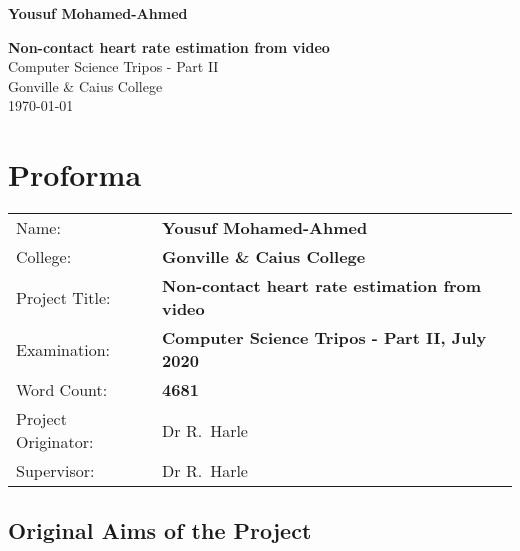 \documentclass[12pt,twoside,notitlepage]{report}
\begin{document}





\pagestyle{empty}

\hfill{\LARGE \bf Yousuf Mohamed-Ahmed}

\vspace*{60mm}
\begin{center}
\Huge
{\bf Non-contact heart rate estimation from video} \\
\vspace*{5mm}
Computer Science Tripos - Part II  \\
\vspace*{5mm}
Gonville \& Caius College\\
\vspace*{5mm}
\today  %
\end{center}

\cleardoublepage


\setcounter{page}{1}
\pagestyle{plain}

\chapter*{Proforma}

{\large
\begin{tabular}{ll}
Name:               & \bf Yousuf Mohamed-Ahmed \\
College:            & \bf Gonville \& Caius College                     \\
Project Title:      & \bf Non-contact heart rate estimation from video \\
Examination:        & \bf Computer Science Tripos - Part II, July 2020    \\
Word Count:         & \bf 4681\footnotemark[1] \\
Project Originator: & Dr R.~Harle                    \\
Supervisor:         & Dr R.~Harle                    \\ 
\end{tabular}
}


\section*{Original Aims of the Project}
\end{document}
